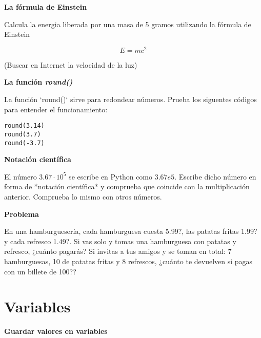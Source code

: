 \documentclass[a4paper, 11pt]{scrartcl}
\newenvironment{code}{\begin{tcolorbox}[colback=red!2!white]}{\end{tcolorbox}}
\begin{document}
\noindent\textbf{\sffamily La fórmula de Einstein}

Calcula la energia liberada por una masa de 5 gramos utilizando la fórmula de Einstein

$$
E= m c^2
$$

(Buscar en Internet la velocidad de la luz)





\noindent\textbf{\sffamily \dag{} La función \textit{round()} }

La función `round()` sirve para redondear números. Prueba los siguentes códigos para entender el funcionamiento:

\smallskip

\begin{code}

\begin{verbatim}
round(3.14)
round(3.7)
round(-3.7)
\end{verbatim}

\end{code}





 \noindent\textbf{\sffamily Notación científica}
 
 El número $3.67 \cdot 10^5$ se escribe en Python como $3.67e5$. Escribe dicho número en forma de *notación científica* y comprueba que coincide con la multiplicación anterior. Comprueba lo mismo con otros números.
 
 
 
 
 
 \noindent\textbf{\sffamily Problema}

En una hamburguesería, cada hamburguesa cuesta 5.99?, las patatas fritas 1.99?  y cada refresco 1.49?.  Si vas solo y tomas una hamburguesa con patatas y refresco, ¿cuánto pagarás? Si invitas a tus amigos y se toman en total: 7 hamburguesas, 10 de patatas fritas y 8 refrescos, ¿cuánto te devuelven si pagas con un billete de 100??





\newpage

\section{Variables}





\noindent\textbf{\sffamily Guardar valores en variables}
\end{document}

